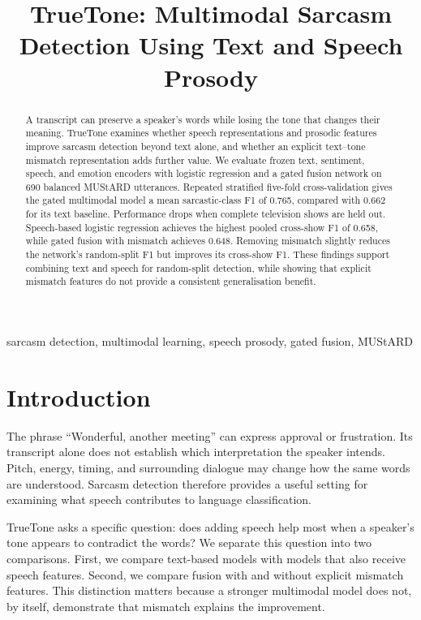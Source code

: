 \documentclass[conference]{IEEEtran}
\title{TrueTone: Multimodal Sarcasm Detection Using Text and Speech Prosody}
\author{
\IEEEauthorblockN{Manas Sharma, Raghav Vats, Vaibhav Singh, and Sumit Bhati}
\IEEEauthorblockA{CSE Artificial Intelligence, Bennett University, Greater Noida, India\\
Enrolments, respectively: S24CSEU2420, S24CSEU1665, S24CSEU1668, S24CSEU2870}
}
\begin{document}
\maketitle

\begin{abstract}
A transcript can preserve a speaker's words while losing the tone that changes their meaning. TrueTone examines whether speech representations and prosodic features improve sarcasm detection beyond text alone, and whether an explicit text--tone mismatch representation adds further value. We evaluate frozen text, sentiment, speech, and emotion encoders with logistic regression and a gated fusion network on 690 balanced MUStARD utterances. Repeated stratified five-fold cross-validation gives the gated multimodal model a mean sarcastic-class F1 of 0.765, compared with 0.662 for its text baseline. Performance drops when complete television shows are held out. Speech-based logistic regression achieves the highest pooled cross-show F1 of 0.658, while gated fusion with mismatch achieves 0.648. Removing mismatch slightly reduces the network's random-split F1 but improves its cross-show F1. These findings support combining text and speech for random-split detection, while showing that explicit mismatch features do not provide a consistent generalisation benefit.
\end{abstract}
\begin{IEEEkeywords}
sarcasm detection, multimodal learning, speech prosody, gated fusion, MUStARD
\end{IEEEkeywords}

\section{Introduction}
The phrase ``Wonderful, another meeting'' can express approval or frustration. Its transcript alone does not establish which interpretation the speaker intends. Pitch, energy, timing, and surrounding dialogue may change how the same words are understood. Sarcasm detection therefore provides a useful setting for examining what speech contributes to language classification.

TrueTone asks a specific question: does adding speech help most when a speaker's tone appears to contradict the words? We separate this question into two comparisons. First, we compare text-based models with models that also receive speech features. Second, we compare fusion with and without explicit mismatch features. This distinction matters because a stronger multimodal model does not, by itself, demonstrate that mismatch explains the improvement.
\end{document}
